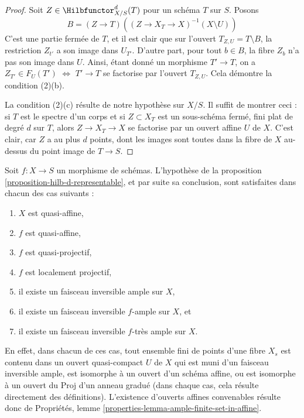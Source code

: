 \begin{proof}
\medskip\noindent
Soit $Z \in \Hilbfunctor^d_{X/S}(T)$ pour un schéma $T$ sur $S$. Posons
$$
B = (Z \to T)\left((Z \to X_T \to X)^{-1}(X \setminus U)\right)
$$
C'est une partie fermée de $T$, et il est clair que sur l'ouvert
$T_{Z, U} = T \setminus B$, la restriction $Z_{t'}$ a son image dans $U_{T'}$.
D'autre part, pour tout $b \in B$, la fibre $Z_b$ n'a pas son image
dans $U$. Ainsi, étant donné un morphisme $T' \to T$, on
a $Z_{T'} \in F_U(T')$ $\Leftrightarrow$ $T' \to T$ se factorise par
l'ouvert $T_{Z, U}$. Cela démontre la condition (2)(b).

\medskip\noindent
La condition (2)(c) résulte de notre hypothèse sur $X/S$. Il suffit de
montrer ceci : si $T$ est le spectre d'un corps
et si $Z \subset X_T$ est un sous-schéma fermé, fini plat de degré
$d$ sur $T$, alors $Z \to X_T \to X$ se factorise par un ouvert affine
$U$ de $X$. C'est clair, car $Z$ a au plus $d$ points,
dont les images sont toutes dans la fibre de $X$ au-dessus du point image
de $T \to S$.
\end{proof}

\begin{remark}
\label{remark-when-proposition-applies}
Soit $f : X \to S$ un morphisme de schémas. L'hypothèse de la
proposition \ref{proposition-hilb-d-representable}, et par
suite sa conclusion, sont satisfaites dans chacun des cas suivants :
\begin{enumerate}
\item $X$ est quasi-affine,
\item $f$ est quasi-affine,
\item $f$ est quasi-projectif,
\item $f$ est localement projectif,
\item il existe un faisceau inversible ample sur $X$,
\item il existe un faisceau inversible $f$-ample sur $X$, et
\item il existe un faisceau inversible $f$-très ample sur $X$.
\end{enumerate}
En effet, dans chacun de ces cas, tout ensemble fini de points d'une
fibre $X_s$ est contenu dans un ouvert quasi-compact $U$ de $X$
qui est muni d'un faisceau inversible ample, est isomorphe
à un ouvert d'un schéma affine, ou est isomorphe à un ouvert
du $\text{Proj}$ d'un anneau gradué (dans chaque cas, cela résulte
directement des définitions). L'existence d'ouverts affines convenables
résulte donc de
Propriétés, lemme \ref{properties-lemma-ample-finite-set-in-affine}.
\end{remark}




